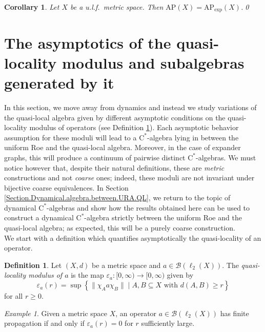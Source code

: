 \documentclass[11pt]{amsart}
\newcommand{\cB}{\mathcal{B}}
\newcommand{\eps}{\varepsilon}
\newcommand{\cstar}{$\mathrm{C}^*$}
\numberwithin{equation}{section}
\newtheorem{corollary}[theorem]{Corollary}
\theoremstyle{definition}
\newtheorem{definition}[theorem]{Definition}
\theoremstyle{remark}
\newtheorem{example}[theorem]{Example}
\begin{document}
 \begin{corollary}
     Let $X$ be a u.l.f.\ metric space. Then $\mathrm{AP}(X)=\mathrm{AP}_{\exp}(X)$.\qed
 \end{corollary}



\section{The asymptotics of the quasi-locality  modulus and subalgebras generated by it}\label{Section.QL.algebras}

 In this section, we move away from dynamics and instead we study variations of the quasi-local algebra given by different asymptotic conditions on the quasi-locality modulus of operators (see Definition \ref{Defi.QL.Decay.modulus}). Each asymptotic behavior assumption for these moduli will lead to a \cstar-algebra lying in between the uniform Roe and the quasi-local algebra. Moreover, in the case of expander graphs, this will produce a continuum of pairwise distinct \cstar-algebras. We must notice however that, despite their natural definitions, these  are \emph{metric} constructions and not \emph{coarse} ones; indeed, these moduli are not invariant under bijective  coarse equivalences. In Section \ref{Section.Dynamical.algebra.between.URA.QL}, we return to the topic   of dynamical \cstar-algebras and show how the results obtained here can be used to construct a dynamical \cstar-algebra strictly between the uniform Roe and the quasi-local algebra; as expected, this will be a purely coarse construction. \\

We start with a definition which quantifies asymptotically the quasi-locality of an operator.

\begin{definition}\label{Defi.QL.Decay.modulus}
    Let $(X,d)$ be a metric space and $a\in \cB(\ell_2(X))$. The \emph{quasi-locality modulus of $a$} is the map $\eps_a\colon [0,\infty)\to [0,\infty)$ given by
    \[\eps_a(r)=\sup\left\{\|\chi_Aa\chi_B\|\mid A,B\subseteq X \text{ with } d(A,B)\geq r\right\}\]
    for all $r\geq 0$.
\end{definition}

\begin{example}\label{Example.decay.uRa}
    Given a metric space $X$, an operator $a\in \cB(\ell_2(X))$ has finite propagation if and only if $\eps_a(r)=0$ for $r$ sufficiently large.
\end{example}
\end{document}

